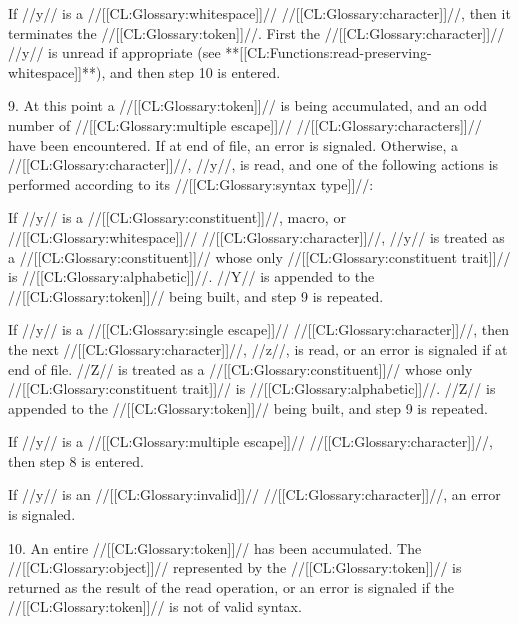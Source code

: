 \itemitem{\bull} If //y// is a //[[CL:Glossary:whitespace]]// //[[CL:Glossary:character]]//, then it terminates the //[[CL:Glossary:token]]//.  First the //[[CL:Glossary:character]]// //y// is unread if appropriate (see **[[CL:Functions:read-preserving-whitespace]]**), and then step 10 is entered. \endlist

\item{9.} At this point a //[[CL:Glossary:token]]// is being accumulated, and an odd number of //[[CL:Glossary:multiple escape]]// //[[CL:Glossary:characters]]// have been encountered. If at end of file, an error  is signaled. Otherwise, a //[[CL:Glossary:character]]//, //y//, is read, and one of the following actions is performed according to its //[[CL:Glossary:syntax type]]//:

\beginlist \itemitem{\bull} If //y// is a //[[CL:Glossary:constituent]]//, macro, or //[[CL:Glossary:whitespace]]// //[[CL:Glossary:character]]//, //y// is treated as a //[[CL:Glossary:constituent]]//  whose only //[[CL:Glossary:constituent trait]]// is //[[CL:Glossary:alphabetic]]//.              //Y// is appended to the //[[CL:Glossary:token]]// being built, and step 9 is repeated.

\itemitem{\bull} If //y// is a //[[CL:Glossary:single escape]]// //[[CL:Glossary:character]]//, then the next //[[CL:Glossary:character]]//, //z//, is read, or an error  is signaled if at end of file. //Z// is treated as a //[[CL:Glossary:constituent]]// whose only //[[CL:Glossary:constituent trait]]// is //[[CL:Glossary:alphabetic]]//. //Z// is appended to the //[[CL:Glossary:token]]// being built, and step 9 is repeated.

\itemitem{\bull} If //y// is a //[[CL:Glossary:multiple escape]]// //[[CL:Glossary:character]]//, then step 8 is entered.

\itemitem{\bull} If //y// is an //[[CL:Glossary:invalid]]// //[[CL:Glossary:character]]//, an error  is signaled. \endlist

\item{10.} An entire //[[CL:Glossary:token]]// has been accumulated. The //[[CL:Glossary:object]]// represented by the //[[CL:Glossary:token]]// is returned  as the result of the read operation, or an error  is signaled if the //[[CL:Glossary:token]]// is not of valid syntax. \endlist

